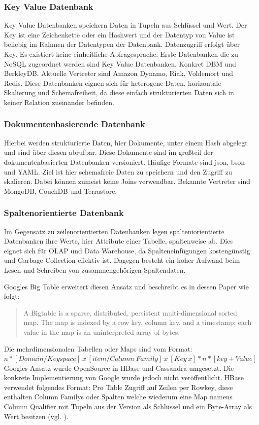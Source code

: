 \subsubsection{Key Value Datenbank}
Key Value Datenbanken speichern Daten in Tupeln aus Schlüssel und Wert.
Der Key ist eine Zeichenkette oder ein Hashwert und der Datentyp von Value ist beliebig im Rahmen der Datentypen der Datenbank.
Datenzugriff erfolgt über Key.
Es existiert keine einheitliche Abfragesprache.
Erste Datenbanken die zu NoSQL zugeordnet werden sind Key Value Datenbanken. Konkret DBM und BerkleyDB.
Aktuelle Vertreter sind Amazon Dynamo, Riak, Voldemort und Redis.
Diese Datenbanken eignen sich für heterogene Daten, horizontale Skalierung und Schemafreiheit, da diese einfach strukturierten Daten sich in keiner Relation zueinander befinden.

\subsubsection{Dokumentenbasierende Datenbank}

Hierbei werden strukturierte Daten, hier Dokumente, unter einem Hash abgelegt und sind über diesen abrufbar.
Diese Dokumente sind im großteil der dokumentenbasierten Datenbanken versioniert.
Häufige Formate sind \Gls{json}, \Gls{bson} und YAML.
Ziel ist hier schemafreie Daten zu speichern und den Zugriff zu skalieren.
Dabei können zumeist keine Joins verwendbar.
Bekannte Vertreter sind MongoDB, CouchDB und Terrastore.

\subsubsection{Spaltenorientierte Datenbank}

Im Gegensatz zu zeilenorientierten Datenbanken legen spalteniorientierte Datenbanken ihre Werte, hier Attribute einer Tabelle, spaltenweise ab.
Dies eignet sich für OLAP und Data Warehouse, da Spalteneinfügungen kostengünstig und Garbage Collection effektiv ist.
Dagegen besteht ein hoher Aufwand beim Lesen und Schreiben von zusammengehörigen Spaltendaten.

Googles Big Table erweitert diesen Ansatz und beschreibt es in dessen Paper wie folgt:
\begin{quote}
A  Bigtable  is  a  sparse,  distributed,  persistent  multi-dimensional sorted map. The map is indexed by a row key, column key, and a timestamp; each value in the map is an uninterpreted array of bytes. \cite[S.1]{paper:bigtable}
\end{quote}
Die mehrdimensionalen Tabellen oder Maps sind vom Format:\\
$n*[Domain / Keyspace]\ x\ [item / Column\ Family]\ x\ [Key\ x]*n*[key+Value]$
Googles Ansatz wurde OpenSource in HBase und Cassandra umgesetzt. Die konkrete Implementierung von Google wurde jedoch nicht veröffentlicht.
HBase verwendet folgendes Format: Pro Table Zugriff auf Zeilen per Rowkey, diese enthalten Column Familys oder Spalten welche wiederum eine Map namens Column Qualifier mit Tupeln aus der Version als Schlüssel und ein Byte-Array als Wert besitzen (vgl. \cite[S.13]{ba:dan}).


